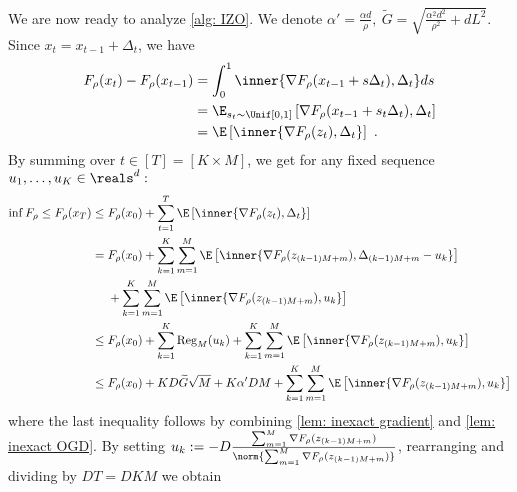 

We are now ready to analyze \cref{alg: IZO}.
We denote $\alpha'=\frac{\alpha d}{\rho},~\widetilde{G}=\sqrt{\frac{\alpha^2 d^2}{\rho^2}+dL^2}$. Since $x_t=x_{t-1}+\Delta_{t}$, we have
\begin{align*}
 F_\rho(x_t)- F_\rho(x_{t-1})
&=\int_{0}^{1}\inner{\nabla F_{\rho}(x_{t-1}+s\Delta_t),\Delta_t}ds
\\
&=\E_{s_t\sim\Unif[0,1]}\left[\nabla F_{\rho}(x_{t-1}+s_t{\Delta}_t),\Delta_t\right]
\\&=\E\left[\inner{\nabla F_{\rho}(z_{t}),\Delta_t}\right]~.
\end{align*}
By summing over $t\in[T]=[K\times M]$, we get for any fixed sequence $u_1,\dots,u_K\in\reals^d:$
\begin{align*}
    \inf  F_\rho\leq  F_\rho(x_T)
    &\leq  F_\rho(x_0)+\sum_{t=1}^{T}\E\left[\inner{\nabla F_{\rho}(z_{t}),\Delta_t}\right]
    \\&= F_\rho(x_0)+\sum_{k=1}^{K}\sum_{m=1}^{M}\E\left[\inner{\nabla F_{\rho}(z_{(k-1)M+m}),\Delta_{(k-1)M+m}-u_k}\right]\\
    &~~~~+\sum_{k=1}^{K}\sum_{m=1}^{M}\E\left[\inner{\nabla F_{\rho}(z_{(k-1)M+m}),u_k}\right]
    \\
    &\leq  F_\rho(x_0)+\sum_{k=1}^{K}\mathrm{Reg}_M(u_k)+\sum_{k=1}^{K}\sum_{m=1}^{M}\E\left[\inner{\nabla F_{\rho}(z_{(k-1)M+m}),u_k}\right]
    \\
    &\leq F_\rho(x_0)+KD\widetilde{G}\sqrt{M}+K\alpha'DM+\sum_{k=1}^{K}\sum_{m=1}^{M}\E\left[\inner{\nabla F_{\rho}(z_{(k-1)M+m}),u_k}\right]
\end{align*}
where the last inequality follows by combining \cref{lem: inexact gradient} and \cref{lem: inexact OGD}.
By setting $u_k:=-D\frac{\sum_{m=1}^{M}\nabla F_{\rho}(z_{(k-1)M+m})}{\norm{\sum_{m=1}^{M}\nabla F_{\rho}(z_{(k-1)M+m})}}$, rearranging and dividing by $DT=DKM$ we obtain
